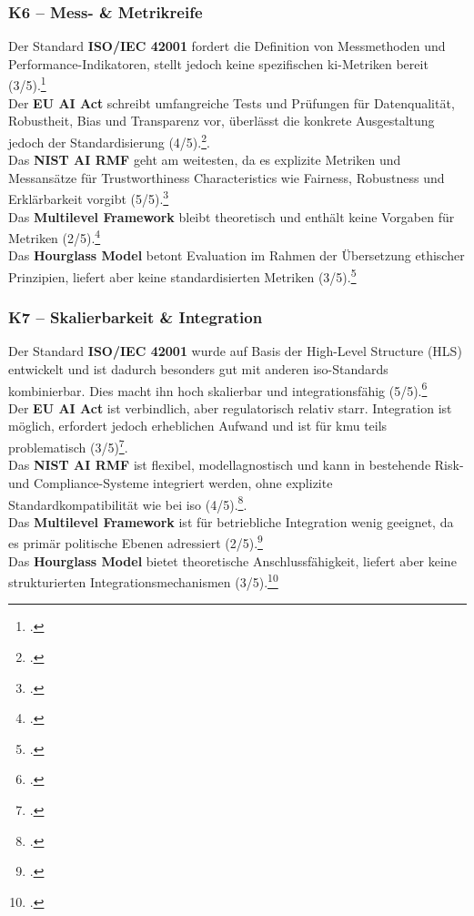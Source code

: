 \subsubsection{K6 – Mess- \& Metrikreife}
Der Standard \textbf{ISO/IEC 42001} fordert die Definition von Messmethoden und Performance-Indikatoren, stellt jedoch keine spezifischen \ac{ki}-Metriken bereit (3/5).\footcite[][Kap.~9.1]{isoISOIEC42001}
\\
Der \textbf{EU AI Act} schreibt umfangreiche Tests und Prüfungen für Datenqualität, Robustheit, Bias und Transparenz vor, überlässt die konkrete Ausgestaltung jedoch der Standardisierung (4/5).\footcite[][S.~4--6]{europeanparliamentaryresearchserviceArtificialIntelligenceAct2024}.  
\\
Das \textbf{NIST AI RMF} geht am weitesten, da es explizite Metriken und Messansätze für Trustworthiness Characteristics wie Fairness, Robustness und Erklärbarkeit vorgibt (5/5).\footcite[][S.~9--12]{nationalinstituteofstandardsandtechnologyAIRiskManagement2021}
\\
Das \textbf{Multilevel Framework} bleibt theoretisch und enthält keine Vorgaben für Metriken (2/5).\footcite[][S.~7--10]{choungMultilevelFrameworkAI2023}
\\
Das \textbf{Hourglass Model} betont Evaluation im Rahmen der Übersetzung ethischer Prinzipien, liefert aber keine standardisierten Metriken (3/5).\footcite[][S.~4--6]{mantymakiPDFPuttingAI2025}

\subsubsection{K7 – Skalierbarkeit \& Integration}
Der Standard \textbf{ISO/IEC 42001} wurde auf Basis der High-Level Structure (HLS) entwickelt und ist dadurch besonders gut mit anderen \ac{iso}-Standards kombinierbar. Dies macht ihn hoch skalierbar und integrationsfähig (5/5).\footcite[][Kap.~4--8]{isoISOIEC42001}
\\
Der \textbf{EU AI Act} ist verbindlich, aber regulatorisch relativ starr.
Integration ist möglich, erfordert jedoch erheblichen Aufwand und ist für \ac{kmu} teils problematisch (3/5)\footcite[][S.~6--7]{europeanparliamentaryresearchserviceArtificialIntelligenceAct2024}.  
\\
Das \textbf{NIST AI RMF} ist flexibel, modellagnostisch und kann in bestehende Risk- und Compliance-Systeme integriert werden, ohne explizite Standardkompatibilität wie bei \ac{iso} (4/5).\footcite[][S.~6--8]{nationalinstituteofstandardsandtechnologyAIRiskManagement2021}.  
\\
Das \textbf{Multilevel Framework} ist für betriebliche Integration wenig geeignet, da es primär politische Ebenen adressiert (2/5).\footcite[][S.~7--10]{choungMultilevelFrameworkAI2023}
\\
Das \textbf{Hourglass Model} bietet theoretische Anschlussfähigkeit, liefert aber keine strukturierten Integrationsmechanismen (3/5).\footcite[][S.~4--6]{mantymakiPDFPuttingAI2025}

